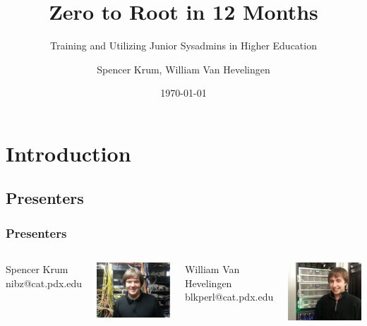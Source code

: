 \documentclass{beamer}
\title{Zero to Root in 12 Months}
\subtitle{Training and Utilizing Junior Sysadmins in Higher Education}
\date{\today}
\author{Spencer Krum, William Van Hevelingen}
\begin{document}
\frame{\titlepage}

\section{Introduction}
\subsection{Presenters}
\frame 
{
    \frametitle{Presenters}
        \begin{columns}[c]
        \begin{center}
        Spencer Krum\\
        nibz@cat.pdx.edu\\
        \end{center}
        \includegraphics[width=1\textwidth]{spencer.jpg}
        
        \begin{center}
        William Van Hevelingen\\
        blkperl@cat.pdx.edu\\
        \end{center}
        \includegraphics[width=1\textwidth]{blkperl.jpg}
        \end{columns}
}
\end{document}
